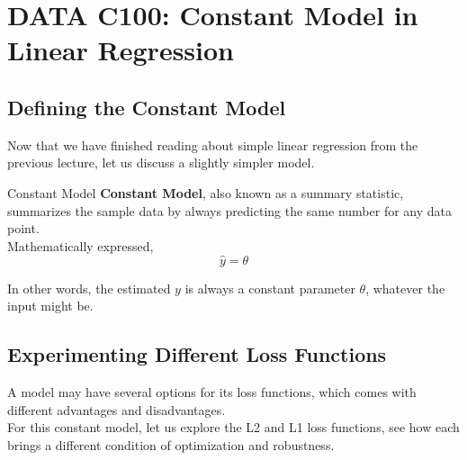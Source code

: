 \chapter{DATA C100: Constant Model in Linear Regression}

\section{Defining the Constant Model}
Now that we have finished reading about simple linear regression from the previous lecture, let us discuss a slightly simpler model.
\begin{ln-define}{Constant Model}{}
    \textbf{Constant Model}, also known as a summary statistic, summarizes the sample data by always predicting the same number for any data point. \\
    Mathematically expressed,
    \[\hat{y} = \theta\]
\end{ln-define}
In other words, the estimated $y$ is always a constant parameter $\theta$, whatever the input might be.

\section{Experimenting Different Loss Functions}
A model may have several options for its loss functions, which comes with different advantages and disadvantages. \\
For this constant model, let us explore the L2 and L1 loss functions, see how each brings a different condition of optimization and robustness.

